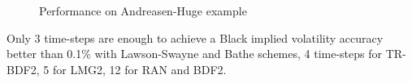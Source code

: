 \documentclass[]{rAMF2e}
\begin{document}
\begin{figure}[htb]
  \begin{center}  
    \end{center}
     \caption{\label{fig:perf_ah_500} Performance on Andreasen-Huge example}
\end{figure}



Only 3 time-steps are enough to achieve a Black implied volatility accuracy better than 0.1\%  with Lawson-Swayne and Bathe schemes, 4 time-steps for TR-BDF2, 5 for LMG2, 12 for RAN and BDF2.
\end{document}
